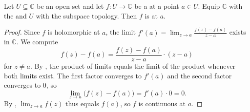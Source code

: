 \begin{proposition} \label{proposition:complex_differentiability_implies_continuity}
Let $U \subseteq \mathbb{C}$ be an open set and let $f : U \to \mathbb{C}$ be a  at a point $a \in U$. Equip $\mathbb{C}$ with the  and $U$ with the subspace topology. Then $f$ is  at $a$.
\end{proposition}

\begin{proof}
    Since $f$ is holomorphic at $a$, the limit $f'(a) = \displaystyle\lim_{z \to a} \frac{f(z) - f(a)}{z - a}$ exists in $\mathbb{C}$. We compute
    $$f(z) - f(a) = \frac{f(z) - f(a)}{z - a} \cdot (z - a)$$
    for $z \neq a$. By , the product of limits equals the limit of the product whenever both limits exist. The first factor converges to $f'(a)$ and the second factor converges to $0$, so
    $$\lim_{z \to a} \bigl(f(z) - f(a)\bigr) = f'(a) \cdot 0 = 0.$$
    By , $\displaystyle\lim_{z \to a} f(z)$ thus equals $f(a)$, so $f$ is continuous at $a$.
\end{proof}